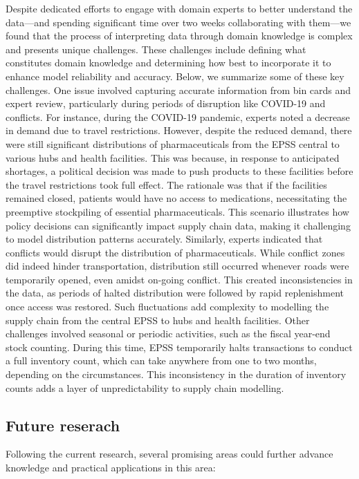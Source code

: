 \documentclass[
  authoryear,
  preprint,
  3p]{elsarticle}
\begin{document}
Despite dedicated efforts to engage with domain experts to better
understand the data---and spending significant time over two weeks
collaborating with them---we found that the process of interpreting data
through domain knowledge is complex and presents unique challenges.
These challenges include defining what constitutes domain knowledge and
determining how best to incorporate it to enhance model reliability and
accuracy. Below, we summarize some of these key challenges. One issue
involved capturing accurate information from bin cards and expert
review, particularly during periods of disruption like COVID-19 and
conflicts. For instance, during the COVID-19 pandemic, experts noted a
decrease in demand due to travel restrictions. However, despite the
reduced demand, there were still significant distributions of
pharmaceuticals from the EPSS central to various hubs and health
facilities. This was because, in response to anticipated shortages, a
political decision was made to push products to these facilities before
the travel restrictions took full effect. The rationale was that if the
facilities remained closed, patients would have no access to
medications, necessitating the preemptive stockpiling of essential
pharmaceuticals. This scenario illustrates how policy decisions can
significantly impact supply chain data, making it challenging to model
distribution patterns accurately. Similarly, experts indicated that
conflicts would disrupt the distribution of pharmaceuticals. While
conflict zones did indeed hinder transportation, distribution still
occurred whenever roads were temporarily opened, even amidst on-going
conflict. This created inconsistencies in the data, as periods of halted
distribution were followed by rapid replenishment once access was
restored. Such fluctuations add complexity to modelling the supply chain
from the central EPSS to hubs and health facilities. Other challenges
involved seasonal or periodic activities, such as the fiscal year-end
stock counting. During this time, EPSS temporarily halts transactions to
conduct a full inventory count, which can take anywhere from one to two
months, depending on the circumstances. This inconsistency in the
duration of inventory counts adds a layer of unpredictability to supply
chain modelling.

\subsection{Future reserach}\label{future-reserach}

Following the current research, several promising areas could further
advance knowledge and practical applications in this area:
\end{document}
